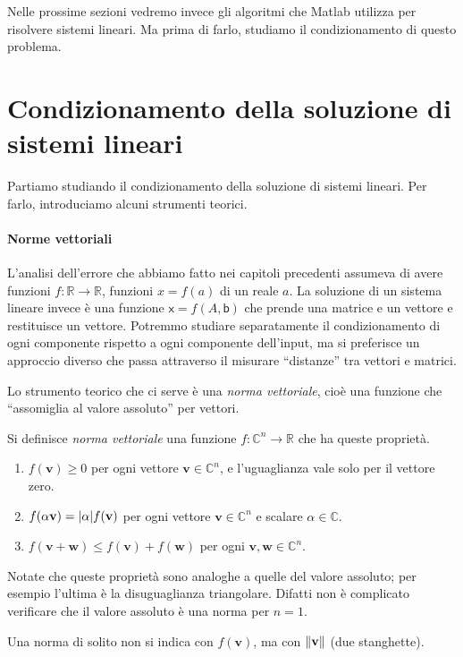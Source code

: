 \documentclass[a4paper]{report}
\DeclarePairedDelimiter{\abs}{\lvert}{\rvert}
\DeclarePairedDelimiter{\norm}{\lVert}{\rVert}
\theoremstyle{definiton}
\theoremstyle{remark}
\begin{document}
Nelle prossime sezioni vedremo invece gli algoritmi che Matlab utilizza per risolvere sistemi lineari. Ma prima di farlo, studiamo il condizionamento di questo problema.

\section{Condizionamento della soluzione di sistemi lineari}

Partiamo studiando il condizionamento della soluzione di sistemi lineari. Per farlo, introduciamo alcuni strumenti teorici.

\paragraph{Norme vettoriali} L'analisi dell'errore che abbiamo fatto nei capitoli precedenti assumeva di avere funzioni $f: \mathbb{R} \to \mathbb{R}$, funzioni $x=f(a)$ di un reale $a$. La soluzione di un sistema lineare invece è una funzione $\mathsf{x} = f(A,\mathsf{b})$ che prende una matrice e un vettore e restituisce un vettore. Potremmo studiare separatamente il condizionamento di ogni componente rispetto a ogni componente dell'input, ma si preferisce un approccio diverso che passa attraverso il misurare ``distanze'' tra vettori e matrici.

Lo strumento teorico che ci serve è una \emph{norma vettoriale}, cioè una funzione che ``assomiglia al valore assoluto'' per vettori.

Si definisce \emph{norma vettoriale} una funzione $f: \mathbb{C}^n \to \mathbb{R}$ che ha queste proprietà.
\begin{enumerate}
    \item $f(\mathbf{v}) \geq 0$ per ogni vettore $\mathbf{v}\in\mathbb{C}^n$, e l'uguaglianza vale solo per il vettore zero.
    \item $f(\alpha \mathbf{v}) = \abs{\alpha} f(\mathbf{v})$ per ogni vettore $\mathbf{v}\in\mathbb{C}^n$ e scalare $\alpha \in \mathbb{C}$.
    \item $f(\mathbf{v}+\mathbf{w}) \leq f(\mathbf{v}) + f(\mathbf{w})$ per ogni $\mathbf{v},\mathbf{w}\in\mathbb{C}^n$.
\end{enumerate}
Notate che queste proprietà sono analoghe a quelle del valore assoluto; per esempio l'ultima è la disuguaglianza triangolare. Difatti non è complicato verificare che il valore assoluto è una norma per $n=1$.

Una norma di solito non si indica con $f(\mathbf{v})$, ma con $\norm{\mathbf{v}}$ (due stanghette).
\end{document}
